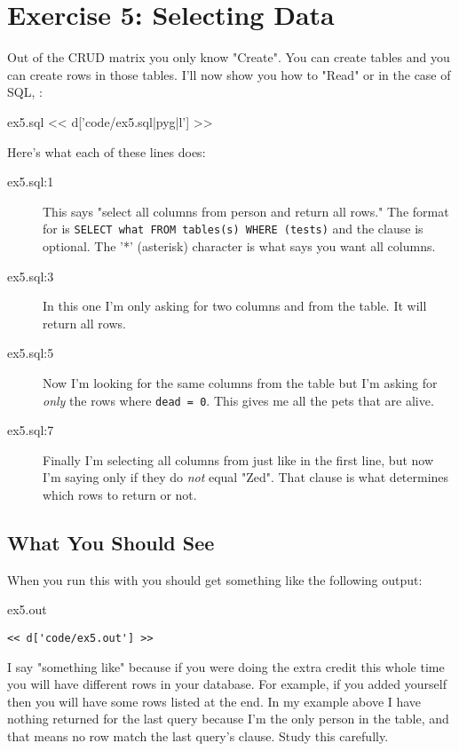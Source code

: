 \chapter{Exercise 5: Selecting Data}

Out of the CRUD matrix you only know "Create".  You can create tables and you
can create rows in those tables.  I'll now show you how to "Read" or in the
case of SQL, :


\begin{code}{ex5.sql}
<< d['code/ex5.sql|pyg|l'] >>
\end{code}

Here's what each of these lines does:

\begin{description}
\item[ex5.sql:1] This says "select all columns from person and return all rows."
    The format for  is \verb|SELECT what FROM tables(s) WHERE (tests)|
    and the  clause is optional.  The '*' (asterisk) character is
    what says you want all columns.
\item[ex5.sql:3] In this one I'm only asking for two columns  and
     from the  table.  It will return all rows.
\item[ex5.sql:5] Now I'm looking for the same columns from the  table
    but I'm asking for \emph{only} the rows where \verb|dead = 0|.  This gives
    me all the pets that are alive.
\item[ex5.sql:7] Finally I'm selecting all columns from  just
    like in the first line, but now I'm saying only if they do \emph{not}
    equal "Zed".  That  clause is what determines which rows
    to return or not.
\end{description}

\section{What You Should See}

When you run this with  you should get something like
the following output:

\begin{code}{ex5.out}
\begin{Verbatim}
<< d['code/ex5.out'] >>
\end{Verbatim}
\end{code}

I say "something like" because if you were doing the extra credit this
whole time you will have different rows in your database.  For example,
if you added yourself then you will have some rows listed at the end.  In
my example above I have nothing returned for the last query because I'm
the only person in the  table, and that means no row
match the last query's  clause.  Study this carefully.

